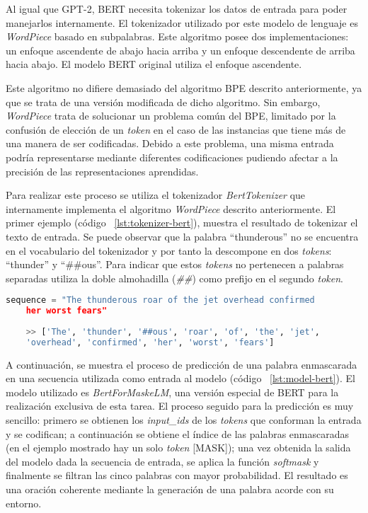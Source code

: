 Al igual que GPT-2, BERT necesita tokenizar los datos de entrada para poder manejarlos internamente. El tokenizador utilizado por este modelo de lenguaje es \textit{WordPiece} \citep{wordpiece} basado en subpalabras. Este algoritmo posee dos implementaciones: un enfoque ascendente de abajo hacia arriba y un enfoque descendente de arriba hacia abajo. El modelo BERT original utiliza el enfoque ascendente.

Este algoritmo no difiere demasiado del algoritmo BPE descrito anteriormente, ya que se trata de una versión modificada de dicho algoritmo. Sin embargo, \textit{WordPiece} trata de solucionar un problema común del BPE, limitado por la confusión de elección de un \textit{token} en el caso de las instancias que tiene más de una manera de ser codificadas. Debido a este problema, una misma entrada podría representarse mediante diferentes codificaciones pudiendo afectar a la precisión de las representaciones aprendidas.

Para realizar este proceso se utiliza el tokenizador \textit{BertTokenizer} que internamente
implementa el algoritmo \textit{WordPiece} descrito anteriormente. El primer ejemplo (código ~\ref{lst:tokenizer-bert}), muestra el resultado de tokenizar el texto de entrada. Se puede observar que la palabra ``thunderous'' no se encuentra en el vocabulario del tokenizador y por tanto la descompone en dos \textit{tokens}: ``thunder'' y ``\#\#ous''. Para indicar que estos \textit{tokens} no pertenecen a palabras separadas utiliza la doble almohadilla (\textit{\#\#}) como prefijo en el segundo \textit{token}.

\begin{lstlisting}[language=Python, caption=Resultado de aplicar \textit{BertTokenizer} a un texto de entrada, label={lst:tokenizer-bert}]
	sequence = "The thunderous roar of the jet overhead confirmed 
	her worst fears"
	
	>> ['The', 'thunder', '##ous', 'roar', 'of', 'the', 'jet', 
	'overhead', 'confirmed', 'her', 'worst', 'fears']
\end{lstlisting} 

A continuación, se muestra el proceso de predicción de una palabra enmascarada en una secuencia utilizada como entrada al modelo (código ~\ref{lst:model-bert}). El modelo utilizado es \textit{BertForMaskeLM}, una versión especial de BERT para la realización exclusiva de esta tarea. El proceso seguido para la predicción es muy sencillo: primero se obtienen los \textit{input\_ids} de los \textit{tokens} que conforman la entrada y se codifican; a continuación se obtiene el índice de las palabras enmascaradas (en el ejemplo mostrado hay un solo \textit{token} [MASK]); una vez obtenida la salida del modelo dada la secuencia de entrada, se aplica la función \textit{softmask} y finalmente se filtran las cinco palabras con mayor probabilidad. El resultado es una oración coherente mediante la generación de una palabra acorde con su entorno.

